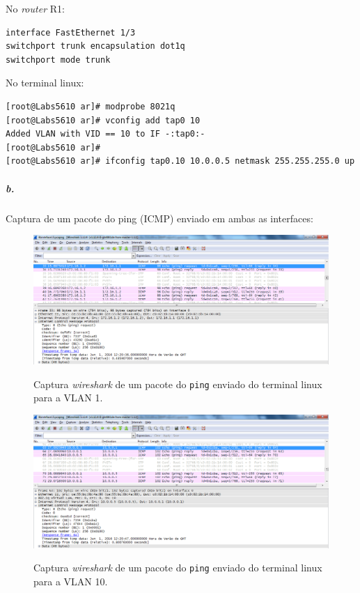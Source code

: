 No \emph{router} \textsf{R1}:
\begin{verbatim}
interface FastEthernet 1/3
switchport trunk encapsulation dot1q
switchport mode trunk
\end{verbatim}

No terminal \textsf{linux}:
\begin{verbatim}
[root@Labs5610 ar]# modprobe 8021q
[root@Labs5610 ar]# vconfig add tap0 10
Added VLAN with VID == 10 to IF -:tap0:-
[root@Labs5610 ar]# 
[root@Labs5610 ar]# ifconfig tap0.10 10.0.0.5 netmask 255.255.255.0 up
\end{verbatim}


\subparagraph{b.}
Captura de um pacote do \textsf{ping} (ICMP) enviado em ambas as interfaces:

\begin{figure}[h]
\centering
\includegraphics[width=1\textwidth, height=0.33\textheight]{4_ping_VLAN1.png}
\label{fig:5-capturaWireshark}
\caption{Captura \emph{wireshark} de um pacote do \texttt{ping} enviado do terminal \textsf{linux} para a \textsf{VLAN 1}.}
\end{figure}

\begin{figure}[h]
\centering
\includegraphics[width=1\textwidth, height=0.33\textheight]{4_ping_VLAN10.png}
\label{fig:6-capturaWireshark}
\caption{Captura \emph{wireshark} de um pacote do \texttt{ping} enviado do terminal \textsf{linux} para a \textsf{VLAN 10}.}
\end{figure}


